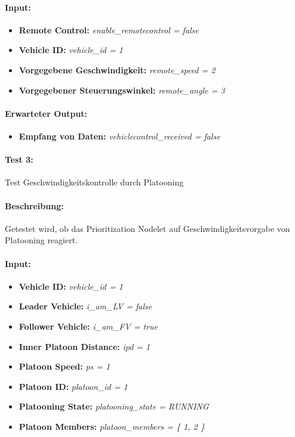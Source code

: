 \documentclass[a4paper, 12pt, titlepage]{scrartcl}
\begin{document}
				\paragraph{Input:}
				\begin{itemize} \itemsep-0.5em
					\item \textbf{Remote Control:} \emph{enable\_remotecontrol = false}
					\item \textbf{Vehicle ID:} \emph{vehicle\_id = 1}
					\item \textbf{Vorgegebene Geschwindigkeit:} \emph{remote\_speed = 2}
					\item \textbf{Vorgegebener Steuerungswinkel:} \emph{remote\_angle = 3}
				\end{itemize}
				\paragraph{Erwarteter Output:}
				\begin{itemize} \itemsep-0.5em
					\item \textbf{Empfang von Daten:} \emph{vehiclecontrol\_received = false}
				\end{itemize}

				\paragraph{Test 3:} {Test Geschwindigkeitskontrolle durch Platooning}
				\paragraph{Beschreibung:} Getestet wird, ob das Prioritization Nodelet auf Geschwindigkeitsvorgabe von Platooning reagiert.
				\paragraph{Input:}
				\begin{itemize} \itemsep-0.5em
					\item \textbf{Vehicle ID:} \emph{vehicle\_id = 1}
					\item \textbf{Leader Vehicle:} \emph{i\_am\_LV = false}
					\item \textbf{Follower Vehicle:} \emph{i\_am\_FV = true}
					\item \textbf{Inner Platoon Distance:} \emph{ipd = 1}
					\item \textbf{Platoon Speed:} \emph{ps = 1}
					\item \textbf{Platoon ID:} \emph{platoon\_id = 1}
					\item \textbf{Platooning State:} \emph{platooning\_state = RUNNING}
					\item \textbf{Platoon Members:} \emph{platoon\_members = \{ 1, 2 \}}
				\end{itemize}
\end{document}
